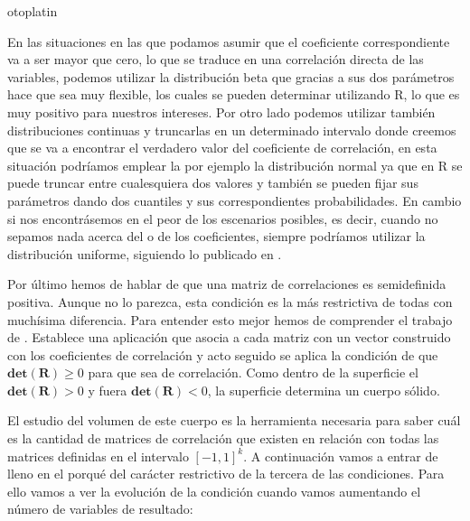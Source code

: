 otoplatin\documentclass[a4paper,openright,12pt]{report}
\begin{document}
En las situaciones en las que podamos asumir que el coeficiente correspondiente va a ser mayor que cero, lo que se traduce en una correlación directa de las variables, podemos utilizar la distribución beta que gracias a sus dos parámetros hace que sea muy flexible, los cuales se pueden determinar utilizando R, lo que es muy positivo para nuestros intereses. Por otro lado podemos utilizar también distribuciones continuas y truncarlas en un determinado intervalo donde creemos que se va a encontrar el verdadero valor del coeficiente de correlación, en esta situación podríamos emplear la por ejemplo la distribución normal ya que en R se puede truncar entre cualesquiera dos valores y también se pueden fijar sus parámetros dando dos cuantiles y sus correspondientes probabilidades. En cambio si nos encontrásemos en el peor de los escenarios posibles, es decir, cuando no sepamos nada acerca del o de los coeficientes, siempre podríamos utilizar la distribución uniforme, siguiendo lo publicado en \cite{Barnard2000}.

Por último hemos de hablar de que una matriz de correlaciones es semidefinida positiva. Aunque no lo parezca, esta condición es la más restrictiva de todas con muchísima diferencia. Para entender esto mejor hemos de comprender el trabajo de \cite{Rousseeuw1994}. Establece una aplicación que asocia a cada matriz con un vector construido con los coeficientes de correlación y acto seguido se aplica la condición de que $\mathbf{det}(\mathbf{R})\geq 0$ para que sea de correlación. Como dentro de la superficie el $\mathbf{det}(\mathbf{R})> 0$ y fuera $\mathbf{det}(\mathbf{R})< 0$, la superficie determina un cuerpo sólido.

El estudio del volumen de este cuerpo es la herramienta necesaria para saber cuál es la cantidad de matrices de correlación que existen en relación con todas las matrices definidas en el intervalo $[-1,1]^{k}$. A continuación vamos a entrar de lleno en el porqué del carácter restrictivo de la tercera de las condiciones. Para ello vamos a ver la evolución de la condición cuando vamos aumentando el número de variables de resultado:
\end{document}
